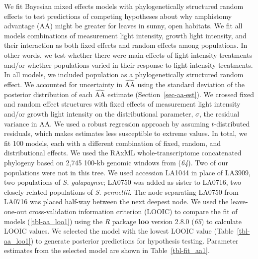 \documentclass[
  letterpaper,
  DIV=11,
  numbers=noendperiod]{scrartcl}
\newcommand{\aax}{$\mathrm{AA}$}
\begin{document}
We fit Bayesian mixed effects models with phylogenetically structured
random effects to test predictions of competing hypotheses about why
amphistomy advantage (\aax) might be greater for leaves in sunny, open
habitats. We fit all models combinations of measurement light intensity,
growth light intensity, and their interaction as both fixed effects and
random effects among populations. In other words, we test whether there
were main effects of light intensity treatments and/or whether
populations varied in their response to light intensity treatments. In
all models, we included population as a phylogenetically structured
random effect. We accounted for uncertainty in \(\widehat{\mathrm{AA}}\)
using the standard deviation of the posterior distribution of each
\(\widehat{\mathrm{AA}}\) estimate (Section~\ref{sec-aa-est}). We
crossed fixed and random effect structures with fixed effects of
measurement light intensity and/or growth light intensity on the
distributional parameter, \(\sigma\), the residual variance in \aax{}.
We used a robust regression approach by assuming \(t\)-distributed
residuals, which makes estimates less susceptible to extreme values. In
total, we fit 100 models, each with a different combination of fixed,
random, and distributional effects. We used the RAxML
whole-transcriptome concatenated phylogeny based on 2,745 100-kb genomic
windows from (\emph{64}). Two of our populations were not in this tree.
We used accession LA1044 in place of LA3909, two populations of \emph{S.
galapagnse}; LA0750 was added as sister to LA0716, two closely related
populations of \emph{S. pennellii}. The node separating LA0750 from
LA0716 was placed half-way between the next deepest node. We used the
leave-one-out cross-validation information criterion (LOOIC) to compare
the fit of models (\autoref{tbl-aa_loo1}) using the \emph{R} package
\textbf{loo} version 2.8.0 (\emph{65}) to calculate LOOIC values. We
selected the model with the lowest LOOIC value (Table~\ref{tbl-aa_loo1})
to generate posterior predictions for hypothesis testing. Parameter
estimates from the selected model are shown in Table~\ref{tbl-fit_aa1}.
\end{document}
